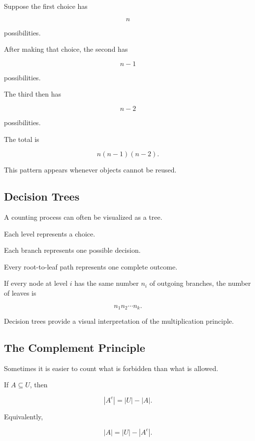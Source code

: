 Suppose the first choice has

\[
n
\]

possibilities.

After making that choice, the second has

\[
n-1
\]

possibilities.

The third then has

\[
n-2
\]

possibilities.

The total is

\[
\boxed{
n(n-1)(n-2).
}
\]

This pattern appears whenever objects cannot be reused.

\subsection{Decision Trees}
\label{subsec:counting-decision-trees}

A counting process can often be visualized as a tree.

Each level represents a choice.

Each branch represents one possible decision.

Every root-to-leaf path represents one complete outcome.

If every node at level \(i\) has the same number \(n_i\) of outgoing
branches, the number of leaves is

\[
\boxed{
n_1n_2\cdots n_k.
}
\]

Decision trees provide a visual interpretation of the multiplication
principle.

\subsection{The Complement Principle}
\label{subsec:complement-principle}

Sometimes it is easier to count what is forbidden than what is allowed.

If \(A\subseteq U\), then

\[
|A^c|
=
|U|-|A|.
\]

Equivalently,

\[
\boxed{
|A|
=
|U|-|A^c|.
}
\]

